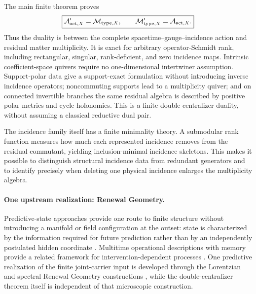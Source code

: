 \documentclass[11pt]{article}
\numberwithin{equation}{section}
\theoremstyle{definition}
\theoremstyle{remark}
\newcommand{\A}{\mathcal A}
\newcommand{\M}{\mathcal M}
\begin{document}
The main finite theorem proves
\begin{equation}
\boxed{
\A_{{\rm act},X}'
=
\M_{{\rm type},X},
\qquad
\M_{{\rm type},X}'
=
\A_{{\rm act},X}.}
\label{eq:intro-main-duality}
\end{equation}
Thus the duality is between the complete
spacetime--gauge--incidence action and residual matter multiplicity.  It is
exact for arbitrary operator-Schmidt rank, including rectangular, singular,
rank-deficient, and zero incidence maps.  Intrinsic coefficient-space quivers
require no one-dimensional intertwiner assumption.  Support-polar data give a support-exact formulation without introducing inverse
incidence operators; noncommuting supports lead to a multiplicity quiver; and
on connected invertible branches the same residual algebra is described by
positive polar metrics and cycle holonomies.  This is a finite double-centralizer duality, without assuming a classical
reductive dual pair.

The incidence family itself has a finite minimality theory.  A submodular
rank function measures how much each represented incidence removes from the
residual commutant, yielding inclusion-minimal incidence skeletons.  This
makes it possible to distinguish structural incidence data from redundant
generators and to identify precisely when deleting one physical incidence
enlarges the multiplicity algebra.


\paragraph{One upstream realization: Renewal Geometry.}

Predictive-state approaches provide one route to finite structure without
introducing a manifold or field configuration at the outset: state is
characterized by the information required for future prediction rather than
by an independently postulated hidden coordinate
\cite{ShaliziCrutchfield2001}.  Multitime operational descriptions with
memory provide a related framework for intervention-dependent processes
\cite{ChiribellaEtAl2009,PollockEtAl2018}.  One predictive realization of the finite joint-carrier input is developed
through the Lorentzian and spectral Renewal Geometry constructions
\cite{PelissierSpacetime2026,PelissierSpectral2026}, while the
double-centralizer theorem itself is independent of that microscopic
construction.
\end{document}
